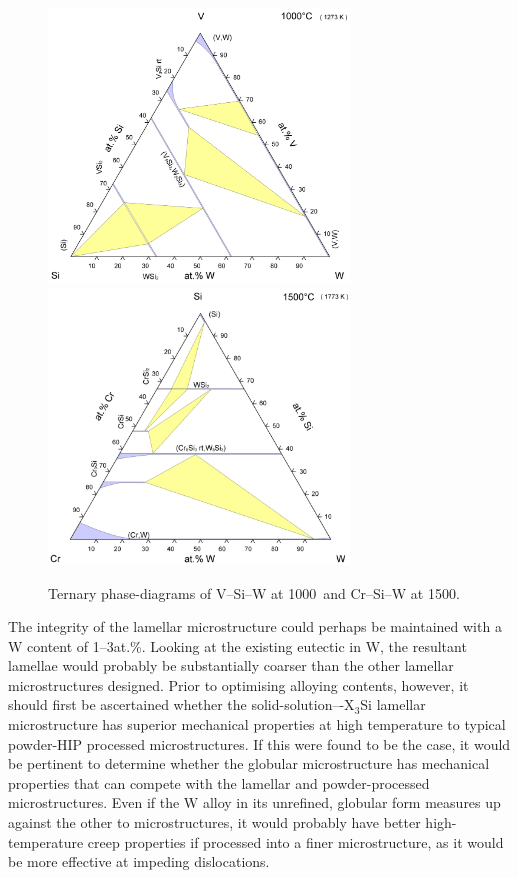 \begin{figure}[htbp]
\begin{center}
\includegraphics[width=8cm]{VSiW1000}
\includegraphics[width=8cm]{CrSiW1500}
\caption{Ternary phase-diagrams of V--Si--W at 1000\celsius\ and Cr--Si--W at 1500\celsius.}
\label{fig:Wtern}
\end{center}
\end{figure}
%


The integrity of the lamellar microstructure could perhaps be maintained with a W content of 1--3at.\%.  Looking at the existing eutectic in W, the resultant lamellae would probably be substantially coarser than the other lamellar microstructures designed.  Prior to optimising alloying contents, however, it should first be ascertained whether the solid-solution–-X$_3$Si  lamellar microstructure has superior mechanical properties at high temperature to typical powder-HIP processed microstructures.  If this were found to be the case, it would be pertinent to determine whether the globular microstructure has mechanical properties that can compete with the lamellar and powder-processed microstructures.  Even if the W alloy in its unrefined, globular form measures up against the other to microstructures, it would probably have better high-temperature creep properties if processed into a finer microstructure, as it would be more effective at impeding dislocations.



